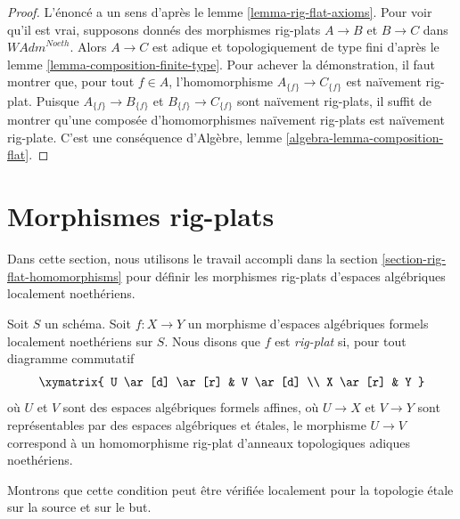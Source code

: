 \begin{proof}
L'énoncé a un sens d'après le lemme \ref{lemma-rig-flat-axioms}.
Pour voir qu'il est vrai, supposons donnés des morphismes rig-plats
$A \to B$ et $B \to C$ dans $\textit{WAdm}^{Noeth}$.
Alors $A \to C$ est adique et topologiquement de type fini
d'après le lemme \ref{lemma-composition-finite-type}.
Pour achever la démonstration, il faut montrer que, pour tout $f \in A$,
l'homomorphisme $A_{\{f\}} \to C_{\{f\}}$ est naïvement rig-plat.
Puisque $A_{\{f\}} \to B_{\{f\}}$ et $B_{\{f\}} \to C_{\{f\}}$
sont naïvement rig-plats, il suffit de montrer qu'une
composée d'homomorphismes naïvement rig-plats est naïvement rig-plate.
C'est une conséquence d'Algèbre, lemme \ref{algebra-lemma-composition-flat}.
\end{proof}











\section{Morphismes rig-plats}
\label{section-rig-flat-morphisms}

\noindent
Dans cette section, nous utilisons le travail accompli dans la
section \ref{section-rig-flat-homomorphisms}
pour définir les morphismes rig-plats d'espaces algébriques localement noethériens.

\begin{definition}
\label{definition-rig-flat}
Soit $S$ un schéma. Soit $f : X \to Y$ un morphisme d'espaces algébriques
formels localement noethériens sur $S$. Nous disons que $f$ est
{\it rig-plat} si, pour tout diagramme commutatif
$$
\xymatrix{
U \ar[d] \ar[r] & V \ar[d] \\
X \ar[r] & Y
}
$$
où $U$ et $V$ sont des espaces algébriques formels affines, où $U \to X$ et $V \to Y$
sont représentables par des espaces algébriques et étales, le morphisme $U \to V$
correspond à un homomorphisme rig-plat d'anneaux topologiques adiques noethériens.
\end{definition}

\noindent
Montrons que cette condition peut être vérifiée localement pour la topologie
étale sur la source et sur le but.

